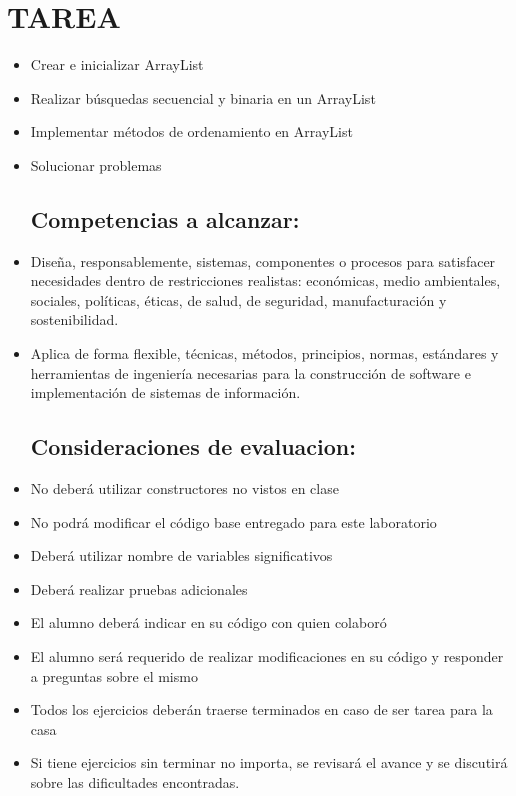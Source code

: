 \documentclass{article}
\begin{document}
    \section{TAREA}
	\begin{itemize}	
    \subsection{Objetivos:}
		\item Crear e inicializar ArrayList
		\item Realizar búsquedas secuencial y binaria en un ArrayList
        \item Implementar métodos de ordenamiento en ArrayList
        \item Solucionar problemas
    \subsection{Competencias a alcanzar:}
		\item Diseña, responsablemente, sistemas, componentes o procesos para satisfacer necesidades dentro de restricciones realistas: económicas, medio ambientales, sociales, políticas, éticas, de salud, de seguridad, manufacturación y sostenibilidad.
        \item Aplica de forma flexible, técnicas, métodos, principios, normas, estándares y herramientas de ingeniería necesarias para la construcción de software e implementación de sistemas de información.
    \subsection{Consideraciones de evaluacion:}
        \item No deberá utilizar constructores no vistos en clase
        \item No podrá modificar el código base entregado para este laboratorio
        \item Deberá utilizar nombre de variables significativos
        \item Deberá realizar pruebas adicionales
        \item El alumno deberá indicar en su código con quien colaboró
        \item El alumno será requerido de realizar modificaciones en su código y responder a preguntas sobre el mismo
        \item Todos los ejercicios deberán traerse terminados en caso de ser tarea para la casa
        \item Si tiene ejercicios sin terminar no importa, se revisará el avance y se discutirá sobre las dificultades encontradas.

\end{itemize}
\end{document}
